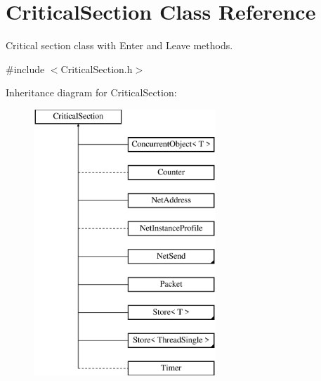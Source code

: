 \hypertarget{class_critical_section}{
\section{CriticalSection Class Reference}
\label{class_critical_section}
}


Critical section class with Enter and Leave methods.  




{\ttfamily \#include $<$CriticalSection.h$>$}

Inheritance diagram for CriticalSection:\begin{figure}[H]
\begin{center}
\leavevmode
\includegraphics[height=10.000000cm]{class_critical_section}
\end{center}
\end{figure}
